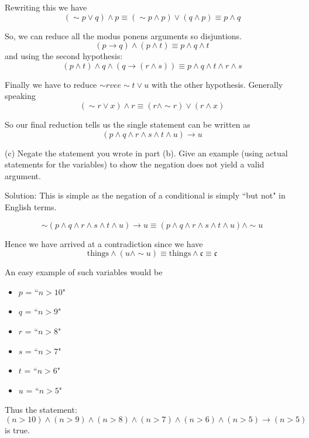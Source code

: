 \documentclass[16 pt]{amsart}
\theoremstyle{definition}
\theoremstyle{remark}
\numberwithin{equation}{subsection}
\begin{document}
Rewriting this we have
\[
(\sim p \vee q) \wedge p \equiv (\sim p \wedge p) \vee (q \wedge p) \equiv p\wedge q
\]

So, we can reduce all the modus ponens arguments so disjuntions.
\[
(p \rightarrow q)\wedge (p\wedge t) \equiv p\wedge q \wedge t
\]
and using the second hypothesis:
\[
(p\wedge t)\wedge q \wedge (q\rightarrow (r\wedge s)) \equiv p\wedge q\wedge t\wedge r\wedge s
\]

Finally we have to reduce $\sim r vee \sim t \vee u$ with the other hypothesis. Generally speaking
\[
(\sim r \vee x)\wedge r \equiv (r\wedge \sim r)\vee (r\wedge x)
\]

So our final reduction tells us the single statement can be written as 
\[
(p\wedge q\wedge r\wedge s\wedge t\wedge u) \rightarrow u
\]



\vspace{.5in}

(c) Negate the statement you wrote in part (b).  Give an example (using actual statements for the variables) to show the negation does not yield a valid argument.

\vspace{.5in}

Solution:  This is simple as the negation of a conditional is simply ``but not" in English terms.

\[
\sim (p\wedge q\wedge r\wedge s\wedge t\wedge u) \rightarrow u \equiv (p\wedge q\wedge r\wedge s\wedge t\wedge u) \wedge \sim u
\]

Hence we have arrived at a contradiction since we have 
\[
\text{things} \wedge (u\wedge \sim u) \equiv \text{things}\wedge \mathfrak{c} \equiv \mathfrak{c}
\]


An easy example of such variables would be
\begin{itemize}
\item[] $p$ = ``$n > 10$"\\
\item[] $q$ = ``$n > 9$"\\
\item[] $r$ = ``$n > 8$"\\
\item[] $s$ = ``$n > 7$"\\
\item[] $t$ = ``$n > 6$"\\
\item[] $u$ = ``$n > 5$"\\
\end{itemize}
Thus the statement:
\[
(n>10)\wedge (n>9)\wedge (n>8)\wedge (n>7)\wedge (n>6)\wedge (n>5)\rightarrow (n>5)
\]
is true.
\end{document}
